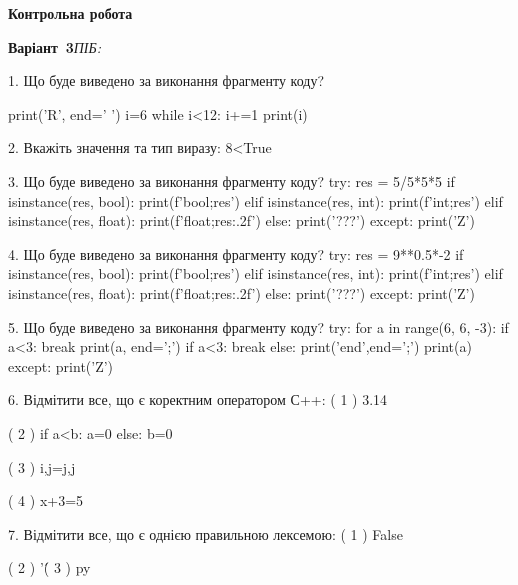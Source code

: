\documentclass[11pt]{article}
\begin{document}
{\large\textbf{Контрольна робота}}

\textbf{Варіант \No\,3}\hfill \textit{ПІБ:}\,\underline{\hspace{60mm}}
\vspace{4mm}

1. Що буде виведено за виконання фрагменту коду?

print('R', end=' ')
i=6
while i<12:
    i+=1
print(i)

\vspace{5mm}

2. 
Вкажіть значення та тип виразу:
8<True
\vspace{5mm}

3. Що буде виведено за виконання фрагменту коду?
try:
    res = 5/5*5*5
    if isinstance(res, bool):
        print(f'bool;{res}')
    elif isinstance(res, int):
        print(f'int;{res}')
    elif isinstance(res, float):
        print(f'float;{res:.2f}')
    else:
        print('???')
except:
    print('Z')
\vspace{5mm}

4. Що буде виведено за виконання фрагменту коду?
try:
    res = 9**0.5*-2
    if isinstance(res, bool):
        print(f'bool;{res}')
    elif isinstance(res, int):
        print(f'int;{res}')
    elif isinstance(res, float):
        print(f'float;{res:.2f}')
    else:
        print('???')
except:
    print('Z')
\vspace{5mm}

5. Що буде виведено за виконання фрагменту коду?
try:
    for a in range(6, 6, -3):
        if a<3:
            break
        print(a, end=';')
        if a<3:
            break
    else:
        print('end',end=';')
    print(a)
except:
    print('Z')
\vspace{5mm}

6. %
Відмітити все, що є коректним оператором С++:
( 1 ) 3.14%

( 2 ) if a<b: a=0 else: b=0

( 3 ) i,j=j,j

( 4 ) x+3=5
\vspace{5mm}

7. %
Відмітити все, що є однією правильною лексемою:
( 1 ) False

( 2 ) '\'

( 3 ) py
\end{document}
